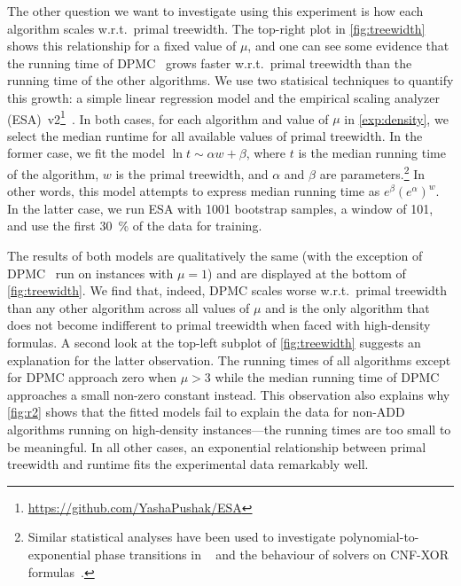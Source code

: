 \documentclass{article}
\theoremstyle{definition}
\begin{document}
The other question we want to investigate using this experiment is how each algorithm scales w.r.t.\ primal treewidth. The top-right plot in \cref{fig:treewidth} shows this relationship for a fixed value of $\mu$, and one can see some evidence that the running time of \textsc{DPMC}~\cite{DBLP:conf/cp/DudekPV20} grows faster w.r.t.\ primal treewidth than the running time of the other algorithms. We use two statisical techniques to quantify this growth: a simple linear regression model and the empirical scaling analyzer (ESA)~v2\footnote{\url{https://github.com/YashaPushak/ESA}}~\cite{DBLP:conf/gecco/PushakH20}. In both cases, for each algorithm and value of $\mu$ in \cref{exp:density}, we select the median runtime for all available values of primal treewidth. In the former case, we fit the model $\ln t \sim \alpha w + \beta$, where $t$ is the median running time of the algorithm, $w$ is the primal treewidth, and $\alpha$ and $\beta$ are parameters.\footnote{Similar statistical analyses have been used to investigate polynomial-to-exponential phase transitions in \SAT{}~\cite{DBLP:journals/constraints/CoarfaDASV03} and the behaviour of \SAT{} solvers on CNF-XOR formulas~\cite{DBLP:conf/ijcai/DudekMV17}.} In other words, this model attempts to express median running time as $e^\beta{(e^\alpha)}^w$. In the latter case, we run ESA with 1001 bootstrap samples, a window of 101, and use the first \SI{30}{\percent} of the data for training.

The results of both models are qualitatively the same (with the exception of \textsc{DPMC}~\cite{DBLP:conf/cp/DudekPV20} run on instances with $\mu = 1$) and are displayed at the bottom of \cref{fig:treewidth}. We find that, indeed, \textsc{DPMC} scales worse w.r.t.\ primal treewidth than any other algorithm across all values of $\mu$ and is the only algorithm that does not become indifferent to primal treewidth when faced with high-density formulas. A second look at the top-left subplot of \cref{fig:treewidth} suggests an explanation for the latter observation. The running times of all algorithms except for \textsc{DPMC} approach zero when $\mu > 3$ while the median running time of \textsc{DPMC} approaches a small non-zero constant instead. This observation also explains why \cref{fig:r2} shows that the fitted models fail to explain the data for non-ADD algorithms running on high-density instances---the running times are too small to be meaningful. In all other cases, an exponential relationship between primal treewidth and runtime fits the experimental data remarkably well.
\end{document}
